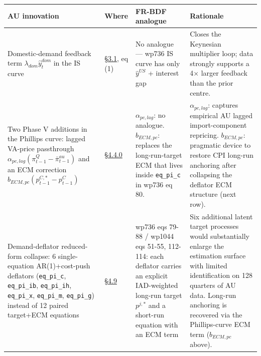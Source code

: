 \documentclass[
]{article}
\newcounter{none} %
\begin{document}
{\def\LTcaptype{none} %
\begin{longtable}[]{@{}
  >{\raggedright\arraybackslash}p{}
  >{\raggedright\arraybackslash}p{}
  >{\raggedright\arraybackslash}p{}
  >{\raggedright\arraybackslash}p{}@{}}
\toprule\noalign{}
\begin{minipage}[b]{\linewidth}\raggedright
AU innovation
\end{minipage} & \begin{minipage}[b]{\linewidth}\raggedright
Where
\end{minipage} & \begin{minipage}[b]{\linewidth}\raggedright
FR-BDF analogue
\end{minipage} & \begin{minipage}[b]{\linewidth}\raggedright
Rationale
\end{minipage} \\
\midrule\noalign{}
\endhead
\bottomrule\noalign{}
\endlastfoot
Domestic-demand feedback term \(\lambda_{dom}\hat{y}^{dom}_t\) in the IS
curve & \hyperref[31-the-e-sat-expectation-satellite-model]{§3.1}, eq
(1) & No analogue --- wp736 IS curve has only \(\hat{y}^{US}\) +
interest gap & Closes the Keynesian multiplier loop; data strongly
supports a 4× larger feedback than the prior centre. \\
Two Phase V additions in the Phillips curve: lagged VA-price passthrough
\(\alpha_{pc,lag}(\pi^Q_{t-1} - \bar{\pi}^{au}_{t-1})\) and an ECM
correction \(b_{ECM,pc}(p^{C,\ast}_{t-1} - p^C_{t-1})\) &
\hyperref[440-e-sat-inflation-equation-and-expectation-formation]{§4.4.0}
& \(\alpha_{pc,lag}\): no analogue. \(b_{ECM,pc}\): replaces the
long-run-target ECM that lives inside \texttt{eq\_pi\_c} in wp736 eq 80.
& \(\alpha_{pc,lag}\): captures empirical AU lagged import-component
repricing. \(b_{ECM,pc}\): pragmatic device to restore CPI long-run
anchoring after collapsing the deflator ECM structure (next row). \\
Demand-deflator reduced-form collapse: 6 single-equation AR(1)+cost-push
deflators (\texttt{eq\_pi\_c}, \texttt{eq\_pi\_ib}, \texttt{eq\_pi\_ih},
\texttt{eq\_pi\_x}, \texttt{eq\_pi\_m}, \texttt{eq\_pi\_g}) instead of
12 paired target+ECM equations &
\hyperref[49-demand-deflators-fr-bdf-section-47--au-reduced-form-simplification]{§4.9}
& wp736 eqs 79-88 / wp1044 eqs 51-55, 112-114: each deflator carries an
explicit IAD-weighted long-run target \(p^{j,\ast}\) and a short-run
equation with an ECM term & Six additional latent target processes would
substantially enlarge the estimation surface with limited identification
on 128 quarters of AU data. Long-run anchoring is recovered via the
Phillips-curve ECM term (\(b_{ECM,pc}\) above). \\
\end{longtable}
}
\end{document}
